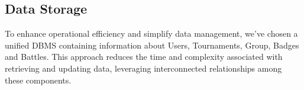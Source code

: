 \subsection{Data Storage} 
To enhance operational efficiency and simplify data management, we've chosen a unified DBMS containing information about Users, Tournaments, Group, Badges and Battles. This approach reduces the time and complexity associated with retrieving and updating data, leveraging interconnected relationships among these components.